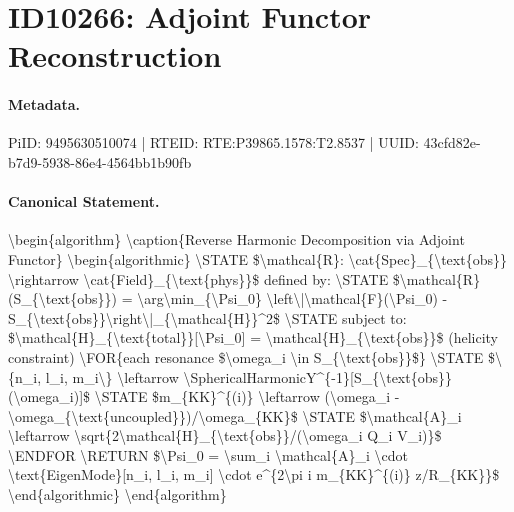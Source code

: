 \section*{ID10266: Adjoint Functor Reconstruction}
\paragraph{Metadata.}
PiID: 9495630510074 | RTEID: RTE:P39865.1578:T2.8537 | UUID: 43cfd82e-b7d9-5938-86e4-4564bb1b90fb

\paragraph{Canonical Statement.}
\textbackslash{}begin\{algorithm\} \textbackslash{}caption\{Reverse Harmonic Decomposition via Adjoint Functor\} \textbackslash{}begin\{algorithmic\} \textbackslash{}STATE \$\textbackslash{}mathcal\{R\}: \textbackslash{}cat\{Spec\}\_\{\textbackslash{}text\{obs\}\} \textbackslash{}rightarrow \textbackslash{}cat\{Field\}\_\{\textbackslash{}text\{phys\}\}\$ defined by: \textbackslash{}STATE \$\textbackslash{}mathcal\{R\}(S\_\{\textbackslash{}text\{obs\}\}) = \textbackslash{}arg\textbackslash{}min\_\{\textbackslash{}Psi\_0\} \textbackslash{}left\textbackslash{}|\textbackslash{}mathcal\{F\}(\textbackslash{}Psi\_0) - S\_\{\textbackslash{}text\{obs\}\}\textbackslash{}right\textbackslash{}|\_\{\textbackslash{}mathcal\{H\}\}\textasciicircum{}2\$ \textbackslash{}STATE subject to: \$\textbackslash{}mathcal\{H\}\_\{\textbackslash{}text\{total\}\}[\textbackslash{}Psi\_0] = \textbackslash{}mathcal\{H\}\_\{\textbackslash{}text\{obs\}\}\$ (helicity constraint) \textbackslash{}FOR\{each resonance \$\textbackslash{}omega\_i \textbackslash{}in S\_\{\textbackslash{}text\{obs\}\}\$\} \textbackslash{}STATE \$\textbackslash{}\{n\_i, l\_i, m\_i\textbackslash{}\} \textbackslash{}leftarrow \textbackslash{}SphericalHarmonicY\textasciicircum{}\{-1\}[S\_\{\textbackslash{}text\{obs\}\}(\textbackslash{}omega\_i)]\$ \textbackslash{}STATE \$m\_\{KK\}\textasciicircum{}\{(i)\} \textbackslash{}leftarrow (\textbackslash{}omega\_i - \textbackslash{}omega\_\{\textbackslash{}text\{uncoupled\}\})/\textbackslash{}omega\_\{KK\}\$ \textbackslash{}STATE \$\textbackslash{}mathcal\{A\}\_i \textbackslash{}leftarrow \textbackslash{}sqrt\{2\textbackslash{}mathcal\{H\}\_\{\textbackslash{}text\{obs\}\}/(\textbackslash{}omega\_i Q\_i V\_i)\}\$ \textbackslash{}ENDFOR \textbackslash{}RETURN \$\textbackslash{}Psi\_0 = \textbackslash{}sum\_i \textbackslash{}mathcal\{A\}\_i \textbackslash{}cdot \textbackslash{}text\{EigenMode\}[n\_i, l\_i, m\_i] \textbackslash{}cdot e\textasciicircum{}\{2\textbackslash{}pi i m\_\{KK\}\textasciicircum{}\{(i)\} z/R\_\{KK\}\}\$ \textbackslash{}end\{algorithmic\} \textbackslash{}end\{algorithm\}

